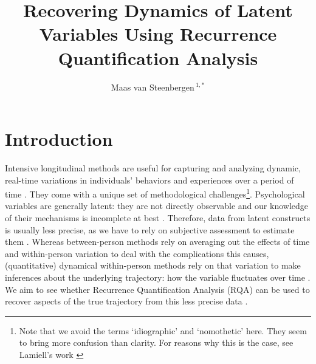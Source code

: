 \documentclass[utf8]{FrontiersinVancouver}
\def\firstAuthorLast{van Steenbergen} %
\def\Authors{Maas van Steenbergen\,$^{1,*}$}
\begin{document}
\onecolumn
{}

\title[Recovering Dynamics Using RQA]{Recovering Dynamics of Latent Variables Using Recurrence Quantification Analysis} 

\author[\firstAuthorLast]{\Authors} %
\address{} %
\correspondance{} %

\extraAuth{}%

\maketitle


\section{Introduction}

Intensive longitudinal methods are useful for capturing and analyzing dynamic, real-time variations in individuals' behaviors and experiences over a period of time \citep{bolgerIntensiveLongitudinalMethods2013}. They come with a unique set of methodological challenges\footnote{Note that we avoid the terms `idiographic' and `nomothetic' here. They seem to bring more confusion than clarity. For reasons why this is the case, see Lamiell's work \citep{lamiellNomotheticIdiographicContrasting1998}}. Psychological variables are generally latent: they are not directly observable and our knowledge of their mechanisms is incomplete at best \citep{bollenLatentVariablesPsychology2002}. Therefore, data from latent constructs is usually less precise, as we have to rely on subjective assessment to estimate them \citep{borsboomLatentVariableTheory2008}. Whereas between-person methods rely on averaging out the effects of time and within-person variation to deal with the complications this causes, (quantitative) dynamical within-person methods rely on that variation to make inferences about the underlying trajectory: how the variable fluctuates over time \citep{molenaarManifestoPsychologyIdiographic2004,molenaarNewPersonSpecificParadigm2009,lamiellStatisticalThinkingPsychology2019}. We aim to see whether Recurrence Quantification Analysis (RQA) can be used to recover aspects of the true trajectory from this less precise data \citep{webber2005recurrence}. 
\end{document}
